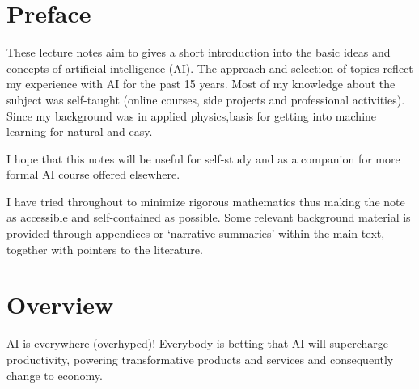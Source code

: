 \documentclass[
  paper=6in:9in,
  pagesize=pdftex,
  headinclude=on,
  footinclude=on,
  12pt]{scrbook}
\author{}
\date{}
\begin{document}
\frontmatter


\mainmatter
\chapter*{Preface}\label{preface}

These lecture notes aim to gives a short introduction into the basic
ideas and concepts of artificial intelligence (AI). The approach and
selection of topics reflect my experience with AI for the past 15 years.
Most of my knowledge about the subject was self-taught (online courses,
side projects and professional activities). Since my background was in
applied physics,basis for getting into machine learning for natural and
easy.

I hope that this notes will be useful for self-study and as a companion
for more formal AI course offered elsewhere.

I have tried throughout to minimize rigorous mathematics thus making the
note as accessible and self-contained as possible. Some relevant
background material is provided through appendices or `narrative
summaries' within the main text, together with pointers to the
literature.

\chapter*{Overview}\label{overview}

AI is everywhere (overhyped)! Everybody is betting that AI will
supercharge productivity, powering transformative products and services
and consequently change to economy.
\end{document}
